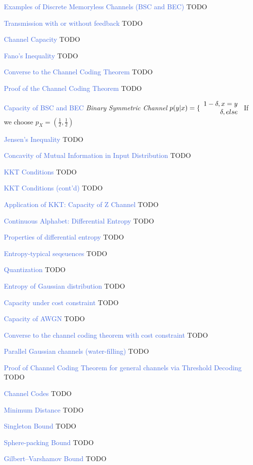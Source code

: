 \documentclass[10pt,a4paper,landscape]{article}
\newcommand{\concept}[1]{\textcolor{RoyalBlue}{#1}}
\newcommand{\subconcept}[1]{\textcolor{PineGreen}{\textit{#1}}}
\begin{document}
\begin{multicols*}{4}
\concept{Examples of Discrete Memoryless Channels (BSC and BEC)} TODO

\concept{Transmission with or without feedback} TODO

\concept{Channel Capacity} TODO

\concept{Fano's Inequality} TODO

\concept{Converse to the Channel Coding Theorem	} TODO
			
\concept{Proof of the Channel Coding Theorem} TODO

\concept{Capacity of BSC and BEC } 
\subconcept{Binary Symmetric Channel}
$p(y|x)=
 \{
   \begin{array}{r c l}
      1-\delta , x=y \\
      \delta, else 
   \end{array}$
If we choose $p_X=(\frac{1}{2},\frac{1}{2})$


\concept{Jensen's Inequality } TODO

\concept{Concavity of Mutual Information in Input Distribution} TODO
 
\concept{KKT Conditions} TODO

\concept{KKT Conditions (cont'd)} TODO
 
\concept{Application of KKT: Capacity of Z Channel} TODO
 
\concept{Continuous Alphabet: Differential Entropy} TODO

\concept{Properties of differential entropy} TODO
 
\concept{Entropy-typical seqeuences} TODO
 
\concept{Quantization} TODO
 
\concept{Entropy of Gaussian distribution} TODO

\concept{Capacity under cost constraint} TODO
 
\concept{Capacity of AWGN} TODO
 
\concept{Converse to the channel coding theorem with cost constraint} TODO
 
\concept{Parallel Gaussian channels (water-filling)} TODO

\concept{Proof of Channel Coding Theorem for general channels via Threshold Decoding} TODO

\concept{Channel Codes} TODO
 
\concept{Minimum Distance} TODO
 
\concept{Singleton Bound} TODO
 
\concept{Sphere-packing Bound} TODO
 
\concept{Gilbert–Varshamov Bound} TODO


\end{multicols*}
\end{document}
